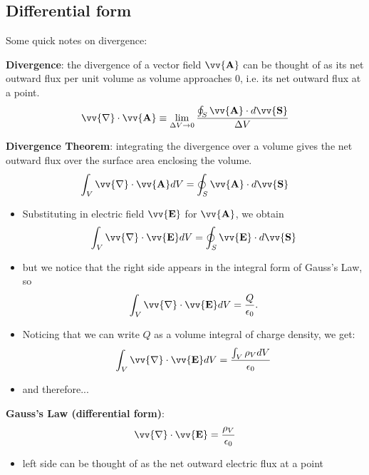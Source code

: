 \documentclass[10pt]{article}
\begin{document}
\subsection{Differential form}
Some quick notes on divergence:
\begin{definition}
    \textbf{Divergence}: the divergence of a vector field $\vv{\mathbf{A}}$ can be thought of as its net outward flux per unit volume as volume approaches 0, i.e. its net outward flux at a point.
    \begin{align}
        \vv{\mathbf{\nabla}} \cdot \vv{\mathbf{A}} \equiv \lim_{\Delta V \to 0} \frac{\oint_S \vv{\mathbf{A}} \cdot d \vv{\mathbf{S}}}{\Delta V}
    \end{align}
\end{definition}
\begin{theorem}
    \textbf{Divergence Theorem}: integrating the divergence over a volume gives the net outward flux over the surface area enclosing the volume.
    \begin{align}
        \int_V \vv{\mathbf{\nabla}} \cdot \vv{\mathbf{A}} dV = \oint_S \vv{\mathbf{A}} \cdot d \vv{\mathbf{S}} 
    \end{align}
\end{theorem}

\begin{itemize}
    \item Substituting in electric field $\vv{\mathbf{E}}$ for $\vv{\mathbf{A}}$, we obtain
    \begin{align}
        \int_V \vv{\mathbf{\nabla}} \cdot \vv{\mathbf{E}} dV = \oint_S \vv{\mathbf{E}} \cdot d \vv{\mathbf{S}} 
    \end{align}
    \item but we notice that the right side appears in the integral form of Gauss's Law, so
    \begin{align}
        \int_V \vv{\mathbf{\nabla}} \cdot \vv{\mathbf{E}} dV = \frac{Q}{\epsilon_0}. 
    \end{align}
    \item Noticing that we can write $Q$ as a volume integral of charge density, we get:
    \begin{align}
        \int_V \vv{\mathbf{\nabla}} \cdot \vv{\mathbf{E}} dV = \frac{\int_V \rho_V dV}{\epsilon_0}        
    \end{align}
    \item and therefore...
\end{itemize}
\begin{theorem}
    \textbf{Gauss's Law (differential form)}:
    \begin{align}
        \vv{\mathbf{\nabla}} \cdot \vv{\mathbf{E}} = \frac{\rho_V}{\epsilon_0}       
    \end{align}
    \begin{itemize}
        \item left side can be thought of as the net outward electric flux at a point
    \end{itemize}
\end{theorem}
\end{document}
